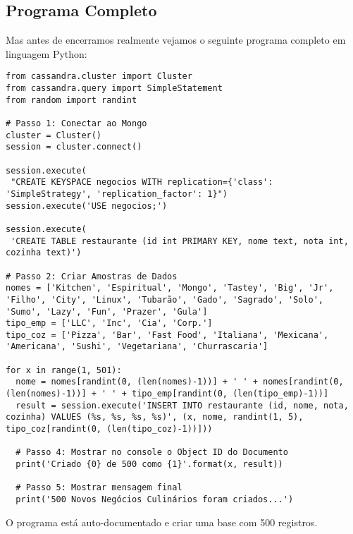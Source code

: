 \subsection{Programa Completo}
Mas antes de encerramos realmente vejamos o seguinte programa completo em linguagem Python:
\begin{lstlisting}[]
from cassandra.cluster import Cluster
from cassandra.query import SimpleStatement
from random import randint

# Passo 1: Conectar ao Mongo
cluster = Cluster()
session = cluster.connect()

session.execute(
 "CREATE KEYSPACE negocios WITH replication={'class': 'SimpleStrategy', 'replication_factor': 1}")
session.execute('USE negocios;')

session.execute(
 'CREATE TABLE restaurante (id int PRIMARY KEY, nome text, nota int, cozinha text)')

# Passo 2: Criar Amostras de Dados
nomes = ['Kitchen', 'Espiritual', 'Mongo', 'Tastey', 'Big', 'Jr', 'Filho', 'City', 'Linux', 'Tubarão', 'Gado', 'Sagrado', 'Solo', 'Sumo', 'Lazy', 'Fun', 'Prazer', 'Gula']
tipo_emp = ['LLC', 'Inc', 'Cia', 'Corp.']
tipo_coz = ['Pizza', 'Bar', 'Fast Food', 'Italiana', 'Mexicana', 'Americana', 'Sushi', 'Vegetariana', 'Churrascaria']

for x in range(1, 501):
  nome = nomes[randint(0, (len(nomes)-1))] + ' ' + nomes[randint(0, (len(nomes)-1))] + ' ' + tipo_emp[randint(0, (len(tipo_emp)-1))]
  result = session.execute('INSERT INTO restaurante (id, nome, nota, cozinha) VALUES (%s, %s, %s, %s)', (x, nome, randint(1, 5), tipo_coz[randint(0, (len(tipo_coz)-1))]))

  # Passo 4: Mostrar no console o Object ID do Documento
  print('Criado {0} de 500 como {1}'.format(x, result))

  # Passo 5: Mostrar mensagem final
  print('500 Novos Negócios Culinários foram criados...')
\end{lstlisting}

O programa está auto-documentado e criar uma base com 500 registros.